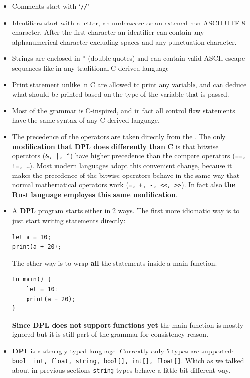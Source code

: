 \documentclass[a4paper]{article}
\newcommand{\urlref}[3][blue]{\href{#2}{\color{#1}{#3}}}%
\begin{document}
\begin{itemize}
    \item Comments start with `\texttt{//}'
    \item Identifiers start with a letter, an underscore or an extened non ASCII UTF-8 character. After the first
        character an identifier can contain any alphanumerical character excluding spaces and any punctuation character.
    \item Strings are enclosed in \texttt{"} (double quotes) and can contain valid ASCII escape sequences like
        in any traditional C-derived language
    \item Print statement unlike in C are allowed to print any variable, and can deduce what should be printed
        based on the type of the variable that is passed.
    \item Most of the grammar is C-inspired, and in fact all control flow statements have
        the same syntax of any C derived language.
    \item The precedence of the operators are taken directly from the \urlref{https://en.cppreference.com/w/c/language/operator_precedence}{C precedence table}.
        The only \textbf{modification that DPL does differently than C} is that bitwise operators (\texttt{\&, |, \^})
        have higher precedence than the compare operators (\texttt{==, !=, \dots}). Most modern languages
        adopt this convenient change, because it makes the precedence of the bitwise operators behave in the same
        way that normal mathematical operators work (\texttt{=, +, -, <<, >>}).
        In fact also \textbf{the Rust language employes this same modification}.
    \item A \textbf{DPL} program starts either in 2 ways. The first more idiomatic way is to just start
        writing statements directly:
        \begin{lstlisting}[language=DPL]
let a = 10;
print(a + 20);
        \end{lstlisting}

        The other way is to wrap \textbf{all} the statements inside a main function.

        \begin{lstlisting}[language=DPL]
fn main() {
    let = 10;
    print(a + 20);
}
        \end{lstlisting}

    \textbf{Since DPL does not support functions yet} the main function is mostly ignored but it is still
    part of the grammar for consistency reason.
    \item \textbf{DPL} is a strongly typed language. Currently only 5 types are supported: \texttt{bool, int, float, string, bool[], int[], float[]}. Which
        as we talked about in previous sections \texttt{string} types behave a little bit different way.



\end{itemize}
\end{document}
